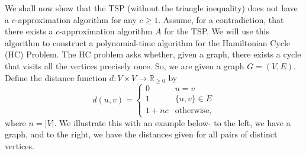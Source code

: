 \documentclass[a4paper, openany]{memoir}
\begin{document}
    We shall now show that the TSP (without the triangle inequality) does not have a $c$-approximation algorithm for any $c \geq 1$. Assume, for a contradiction, that there exists a $c$-approximation algorithm $A$ for the TSP. We will use this algorithm to construct a polynomial-time algorithm for the Hamiltonian Cycle (HC) Problem. The HC problem asks whether, given a graph, there exists a cycle that visits all the vertices precisely once. So, we are given a graph $G = (V, E)$. Define the distance function $d \colon V \times V \to \mathbb{R}_{\geq 0}$ by
    \[d(u, v) = \begin{cases}
        0 & u = v \\
        1 & \{u, v\} \in E \\
        1 + nc & \textrm{otherwise},
    \end{cases}\]
    where $n = |V|$. We illustrate this with an example below- to the left, we have a graph, and to the right, we have the distances given for all pairs of distinct vertices.
    \begin{figure}[H]
        \centering
        \begin{subfigure}[a]{0.45\textwidth}
            \centering
        \end{subfigure}
        \hfill
        \begin{subfigure}[a]{0.45\textwidth}
            \centering
        \end{subfigure}
    \end{figure}
\end{document}

